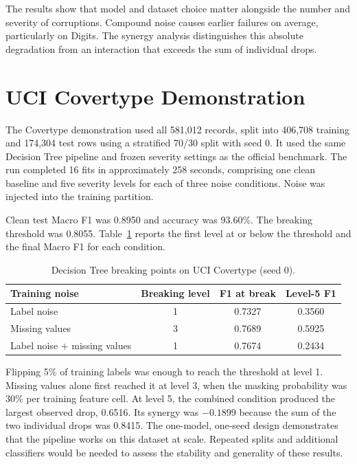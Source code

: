 The results show that model and dataset choice matter alongside the number and severity of corruptions. Compound noise causes earlier failures on average, particularly on Digits. The synergy analysis distinguishes this absolute degradation from an interaction that exceeds the sum of individual drops.

\section{UCI Covertype Demonstration}
\label{sec:covertype-results}

The Covertype demonstration used all 581,012 records, split into 406,708 training and 174,304 test rows using a stratified 70/30 split with seed 0. It used the same Decision Tree pipeline and frozen severity settings as the official benchmark. The run completed 16 fits in approximately 258 seconds, comprising one clean baseline and five severity levels for each of three noise conditions. Noise was injected into the training partition.

Clean test Macro F1 was 0.8950 and accuracy was 93.60\%. The breaking threshold was 0.8055. Table~\ref{tab:covertype} reports the first level at or below the threshold and the final Macro F1 for each condition.

\begin{table}[H]
\centering
\caption{Decision Tree breaking points on UCI Covertype (seed 0).}
\label{tab:covertype}
\small
\begin{tabular}{lccc}
\toprule
\textbf{Training noise} & \textbf{Breaking level} & \textbf{F1 at break} & \textbf{Level-5 F1} \\
\midrule
Label noise & 1 & 0.7327 & 0.3560 \\
Missing values & 3 & 0.7689 & 0.5925 \\
Label noise + missing values & 1 & 0.7674 & 0.2434 \\
\bottomrule
\end{tabular}
\end{table}

Flipping 5\% of training labels was enough to reach the threshold at level 1. Missing values alone first reached it at level 3, when the masking probability was 30\% per training feature cell. At level 5, the combined condition produced the largest observed drop, 0.6516. Its synergy was $-0.1899$ because the sum of the two individual drops was 0.8415. The one-model, one-seed design demonstrates that the pipeline works on this dataset at scale. Repeated splits and additional classifiers would be needed to assess the stability and generality of these results.

